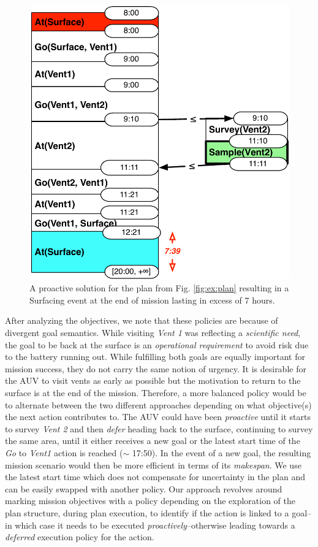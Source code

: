 
\begin{figure}
  \centering
  \includegraphics[width=0.65\columnwidth]{figs/example_early}
  \vskip-3mm
  \caption{\small A proactive solution for the plan from
    Fig. \ref{fig:ex:plan} resulting in a Surfacing event at the end
    of mission lasting in excess of $7$ hours.}
  \label{fig:ex:proactive}
  \vskip-5mm
\end{figure}

After analyzing the objectives, we note that these policies are
because of divergent goal semantics. While visiting {\em Vent 1} was
reflecting a \emph{scientific need}, the goal to be back at the
surface is an \emph{operational requirement} to avoid risk due to the
battery running out. While fulfilling both goals are equally important
for mission success, they do not carry the same notion of urgency. It
is desirable for the AUV to visit vents as early as possible but the
motivation to return to the surface is at the end of the mission.
Therefore, a more balanced policy would be to alternate between the
two different approaches depending on what objective(s) the next
action contributes to. The AUV could have been {\em proactive} until
it starts to survey {\em Vent 2} and then {\em defer} heading back to
the surface, continuing to survey the same area, until it either
receives a new goal or the latest start time of the {\em Go} to
\emph{Vent1} action is reached ($\sim$ 17:50). In the event of a new
goal, the resulting mission scenario would then be more efficient in
terms of its \emph{makespan}. We use the latest start time which does
not compensate for uncertainty in the plan and can be easily swapped
with another policy.  Our approach revolves around marking mission
objectives with a policy depending on the exploration of the plan
structure, during plan execution, to identify if the action is linked
to a goal--in which case it needs to be executed 
{\em proactively}--otherwise leading towards a {\em deferred} execution policy for the
action.
 


